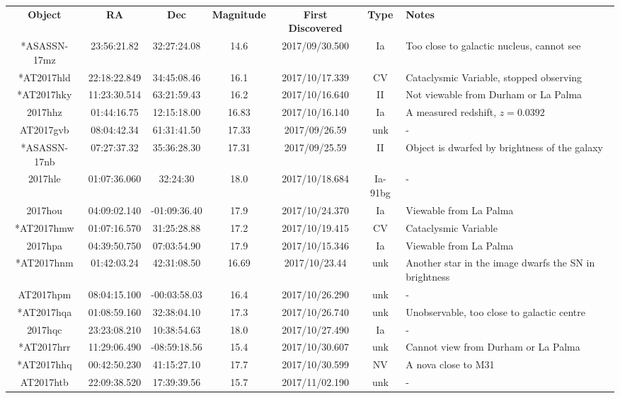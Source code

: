 \documentclass[twocolumn]{revtex4}
\begin{document}
{\renewcommand{\arraystretch}{1.2}%
\begin{table}[h!]
\centering    
\begin{tabularx}{\textwidth}{c c c c @{\hskip 5pt} c c X}
    \hline
    \textbf{Object} & \textbf{RA} & \textbf{Dec} & \textbf{Magnitude} &\textbf{First Discovered} &\textbf{Type} & \textbf{Notes} \\ 
    *ASASSN-17mz & 23:56:21.82 & 32:27:24.08 & 14.6 & 2017/09/30.500 & Ia & {Too close to galactic nucleus, cannot see}  \\
    *AT2017hld & 22:18:22.849 & 34:45:08.46 & 16.1 & 2017/10/17.339 & CV & {Cataclysmic Variable, stopped observing}  \\
    *AT2017hky & 11:23:30.514 & 63:21:59.43 & 16.2 & 2017/10/16.640 & II & {Not viewable from Durham or La Palma}  \\
    2017hhz & 01:44:16.75 & 12:15:18.00 & 16.83 & 2017/10/16.140 & Ia & {A measured redshift, $z=0.0392$}  \\
    AT2017gvb & 08:04:42.34 & 61:31:41.50 & 17.33 & 2017/09/26.59 & unk & {-}  \\
    *ASASSN-17nb & 07:27:37.32 & 35:36:28.30 & 17.31 & 2017/09/25.59 & II & {Object is dwarfed by brightness of the galaxy}  \\
    2017hle & 01:07:36.060 & 32:24:30 & 18.0 & 2017/10/18.684 & Ia-91bg & {-}  \\
    2017hou & 04:09:02.140 & -01:09:36.40 & 17.9 & 2017/10/24.370 &Ia & {Viewable from La Palma}  \\
    *AT2017hmw & 01:07:16.570 & 31:25:28.88 & 17.2 & 2017/10/19.415 & CV & {Cataclysmic Variable}  \\
    2017hpa & 04:39:50.750 & 07:03:54.90 & 17.9 & 2017/10/15.346 & Ia & {Viewable from La Palma}  \\
    *AT2017hnm & 01:42:03.24 & 42:31:08.50 & 16.69 & 2017/10/23.44 & unk & {Another star in the image dwarfs the SN in brightness}  \\
    AT2017hpm & 08:04:15.100 & -00:03:58.03 & 16.4 & 2017/10/26.290 & unk & {-}  \\
    *AT2017hqa & 01:08:59.160 & 32:38:04.10 & 17.3 & 2017/10/26.740 & unk & {Unobservable, too close to galactic centre}  \\
    2017hqc & 23:23:08.210 & 10:38:54.63 & 18.0 & 2017/10/27.490 & Ia & {-}  \\
    *AT2017hrr & 11:29:06.490 & -08:59:18.56 & 15.4 & 2017/10/30.607 & unk & {Cannot view from Durham or La Palma}  \\
    *AT2017hhq & 00:42:50.230 & 41:15:27.10 & 17.7 & 2017/10/30.599 & NV & {A nova close to M31}  \\
    AT2017htb & 22:09:38.520 & 17:39:39.56 & 15.7 & 2017/11/02.190 & unk & {-}  \\
    


\end{tabularx}
\end{table}}
\end{document}
